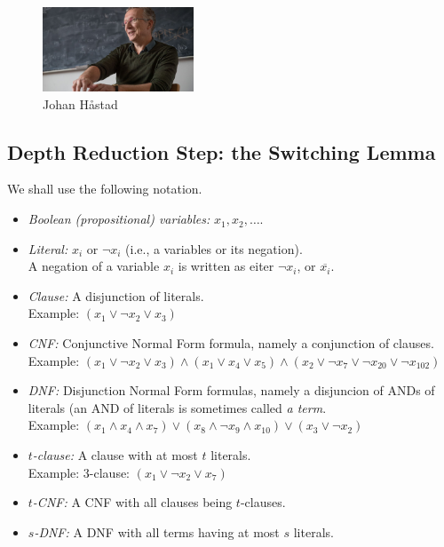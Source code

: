 \begin{figure}
    \centering
    \includegraphics[width=0.4\textwidth]{images/hastad-sitter-600.jpg}
    \caption{Johan H\aa stad}
\end{figure}


\subsection{Depth Reduction Step: the Switching Lemma}

We shall use the following notation.
\begin{itemize}
    \item \textit{Boolean (propositional) variables:} \(x_1, x_2, \ldots \).
    \item \textit{Literal:} \(x_i\) or \(\neg x_i\) (i.e., a variables or its negation).\\
    A negation of a variable  \(x_i\) is written as eiter \(\neg x_i\), or $\overline {x_i}$.
    \item \textit{Clause:} A disjunction of literals.\\
    Example: \((x_1 \lor \neg x_2 \lor x_3)\)
    \item \textit{CNF:} Conjunctive Normal Form formula, namely a conjunction  of clauses.\\
    Example: \((x_1 \lor \neg x_2 \lor x_3) \land (x_1 \lor x_4 \lor x_5) \land (x_2 \lor \neg x_7 \lor \neg x_{20} \lor \neg x_{102})\)
    \item \textit{DNF:} Disjunction Normal Form formulas, namely a disjuncion of ANDs of literals (an AND of literals is sometimes called \emph{a term}.\\
    Example: \((x_1 \land x_4 \land x_7) \lor (x_8 \land \neg x_9 \land x_{10}) \lor (x_3 \lor \neg x_2)\)
    \item \textit{$t$-clause:} A clause with at most \(t\) literals.\\
    Example: 3-clause: \((x_1 \lor \neg x_2 \lor x_7)\)
    \item \textit{$t$-CNF:} A CNF with all clauses being \(t\)-clauses.
    \item \textit{$s$-DNF:} A DNF with all terms  having at most \(s\) literals.
\end{itemize}



